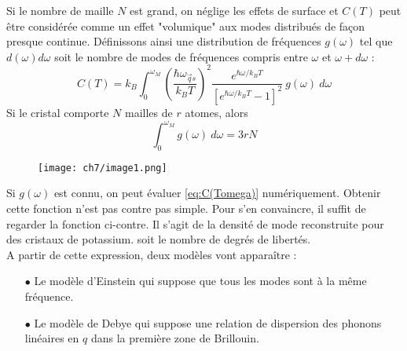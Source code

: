 Si le nombre de maille $N$ est grand, on néglige les effets de surface et 
$C(T)$ peut être considérée comme un effet "volumique" aux modes distribués 
de façon presque continue. Définissons ainsi une distribution de fréquences
$g(\omega)$ tel que $d(\omega)d\omega$ soit le nombre de modes de fréquences 
compris entre $\omega$ et $\omega+d\omega$ :
\begin{equation}
C(T) = k_B\int_0^{\omega_M}\left(\dfrac{\hbar 
\omega_{\vec{q}s}}{k_BT}\right)^2\dfrac{e^{\hbar\omega/k_BT}}{
\left[e^{\hbar\omega/k_BT}-1\right]^2}\ g(\omega)\ d\omega
\label{eq:C(Tomega)}
\end{equation}
Si le cristal comporte $N$ mailles de $r$ atomes, alors
\begin{equation}
\int_0^{\omega_M} g(\omega)\ d\omega = 3rN
\end{equation}
	\begin{wrapfigure}[10]{r}{3.5cm}
	\vspace{-0.5cm}
	\texttt{[image: ch7/image1.png]}
	\end{wrapfigure}
Si $g(\omega)$ est connu, on peut évaluer \autoref{eq:C(Tomega)} numériquement. 
Obtenir cette fonction n'est pas contre pas simple. Pour s'en convaincre, il 
suffit de regarder la fonction ci-contre. Il s'agit de la densité de mode 
reconstruite pour des cristaux de potassium.
soit le nombre de degrés de libertés.\\
A partir de cette expression, deux modèles vont apparaître :
\begin{itemize}
\item[$\bullet$] Le modèle d'Einstein qui suppose que tous les modes sont à
la même fréquence.
\item[$\bullet$] Le modèle de Debye qui suppose une relation de dispersion 
des phonons linéaires en $q$ dans la première zone de Brillouin.
\end{itemize}



